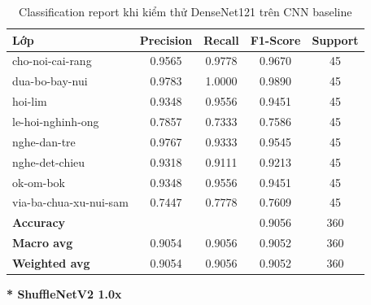\begin{table}[H]
\centering
\renewcommand{\arraystretch}{1.0}
\caption{Classification report khi kiểm thử DenseNet121 trên CNN baseline}
\label{tab:CRDenseNet121}
\begin{tabular}{lcccc}
\hline
\textbf{Lớp} & \textbf{Precision} & \textbf{Recall} & \textbf{F1-Score} & \textbf{Support} \\
\hline
cho-noi-cai-rang          & 0.9565 & 0.9778 & 0.9670 & 45 \\
dua-bo-bay-nui             & 0.9783 & 1.0000 & 0.9890 & 45 \\
hoi-lim                    & 0.9348 & 0.9556 & 0.9451 & 45 \\
le-hoi-nghinh-ong          & 0.7857 & 0.7333 & 0.7586 & 45 \\
nghe-dan-tre               & 0.9767 & 0.9333 & 0.9545 & 45 \\
nghe-det-chieu             & 0.9318 & 0.9111 & 0.9213 & 45 \\
ok-om-bok                  & 0.9348 & 0.9556 & 0.9451 & 45 \\
via-ba-chua-xu-nui-sam     & 0.7447 & 0.7778 & 0.7609 & 45 \\
\hline
\textbf{Accuracy}          & & & 0.9056 & 360 \\
\textbf{Macro avg}         & 0.9054 & 0.9056 & 0.9052 & 360 \\
\textbf{Weighted avg}      & 0.9054 & 0.9056 & 0.9052 & 360 \\
\hline
\end{tabular}
\end{table}
\textbf{* ShuffleNetV2 1.0x}
